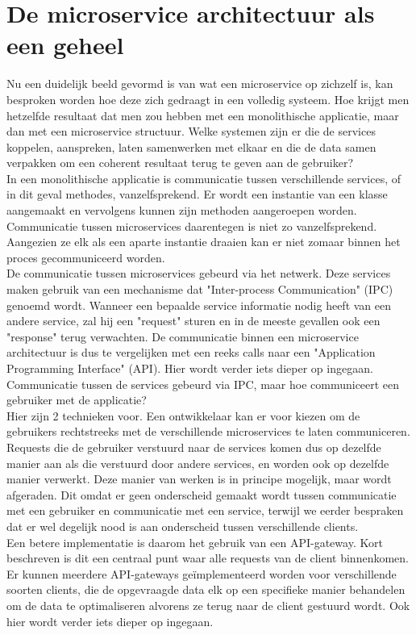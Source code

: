 \documentclass[pdftex,a4paper,12pt,twoside]{report}
\begin{document}
\section{De microservice architectuur als een geheel}
\label{microservice-geheel}
Nu een duidelijk beeld gevormd is van wat een microservice op zichzelf is, kan besproken worden hoe deze zich gedraagt in een volledig systeem. Hoe krijgt men hetzelfde resultaat dat men zou hebben met een monolithische applicatie, maar dan met een microservice structuur. Welke systemen zijn er die de services koppelen, aanspreken, laten samenwerken met elkaar en die de data samen verpakken om een coherent resultaat terug te geven aan de gebruiker?
\\
In een monolithische applicatie is communicatie tussen verschillende services, of in dit geval methodes, vanzelfsprekend. Er wordt een instantie van een klasse aangemaakt en vervolgens kunnen zijn methoden aangeroepen worden. Communicatie tussen microservices daarentegen is niet zo vanzelfsprekend. Aangezien ze elk als een aparte instantie draaien kan er niet zomaar binnen het proces gecommuniceerd worden. 
\\
De communicatie tussen microservices gebeurd via het netwerk. Deze services maken gebruik van een mechanisme dat "Inter-process Communication" (IPC) genoemd wordt. Wanneer een bepaalde service informatie nodig heeft van een andere service, zal hij een "request" sturen en in de meeste gevallen ook een "response" terug verwachten. De communicatie binnen een microservice architectuur is dus te vergelijken met een reeks calls naar een "Application Programming Interface" (API). Hier wordt verder iets dieper op ingegaan.
\\
Communicatie tussen de services gebeurd via IPC, maar hoe communiceert een gebruiker met de applicatie?
\\
Hier zijn 2 technieken voor. Een ontwikkelaar kan er voor kiezen om de gebruikers rechtstreeks met de verschillende microservices te laten communiceren. Requests die de gebruiker verstuurd naar de services komen dus op dezelfde manier aan als die verstuurd door andere services, en worden ook op dezelfde manier verwerkt. Deze manier van werken is in principe mogelijk, maar wordt afgeraden. Dit omdat er geen onderscheid gemaakt wordt tussen communicatie met een gebruiker en communicatie met een service, terwijl we eerder bespraken dat er wel degelijk nood is aan onderscheid tussen verschillende clients.
\\
Een betere implementatie is daarom het gebruik van een API-gateway. Kort beschreven is dit een centraal punt waar alle requests van de client binnenkomen. Er kunnen meerdere API-gateways geïmplementeerd worden voor verschillende soorten clients, die de opgevraagde data elk op een specifieke manier behandelen om de data te optimaliseren alvorens ze terug naar de client gestuurd wordt. Ook hier wordt verder iets dieper op ingegaan.
\end{document}
